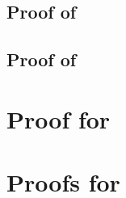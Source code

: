 \documentclass[a4paper,11pt]{book}
\begin{document}
\section{Proof of }\label{PROOF_BAYES_IGSSM_KNOWN_IID_ORACLE_NP}

\section{Proof of }\label{PROOF_BAYES_IGSSM_KNOWN_IID_MINIMAX_NP}

%
\chapter{Proof for }\label{pro:freq:strat}


%
%


\chapter{Proofs for }\label{a:prel}


%
%
\end{document}
